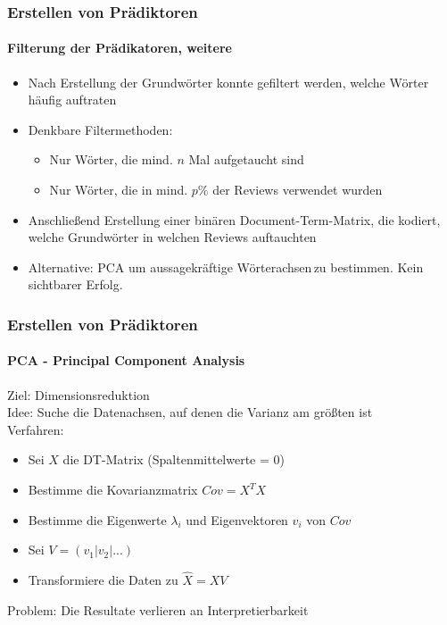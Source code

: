 \documentclass{beamer}
\begin{document}
\begin{frame}
\frametitle{Erstellen von Prädiktoren}
\framesubtitle{Filterung der Prädikatoren, weitere}
\begin{itemize}\itemsep12pt
\item Nach Erstellung der Grundwörter konnte gefiltert werden, welche Wörter häufig auftraten
\item Denkbare Filtermethoden:
\begin{itemize}
\item Nur Wörter, die mind. $n$ Mal aufgetaucht sind 
\item Nur Wörter, die in mind. $p\%$ der Reviews verwendet wurden
\end{itemize} 
\item Anschließend Erstellung einer binären Document-Term-Matrix, die kodiert, welche Grundwörter in welchen Reviews auftauchten
\item Alternative: PCA um aussagekräftige \glqq Wörterachsen\grqq \,zu bestimmen. Kein sichtbarer Erfolg.
\end{itemize}
\end{frame}

\begin{frame}
 \frametitle{Erstellen von Prädiktoren}
 \framesubtitle{PCA - Principal Component Analysis}
 Ziel: Dimensionsreduktion \\
 \vspace{12pt}
 Idee: Suche die Datenachsen, auf denen die Varianz am größten ist \\
 \vspace{12pt}
 Verfahren:\\
 
 \begin{itemize}
  \item Sei $X$ die DT-Matrix (Spaltenmittelwerte = 0)
  \item Bestimme die Kovarianzmatrix $Cov = X^TX$
  \item Bestimme die Eigenwerte $\lambda_i$ und Eigenvektoren $v_i$ von $Cov$
  \item Sei $V = (v_1| v_2| ...)$
  \item Transformiere die Daten zu $\hat{X} = X V$
 \end{itemize}

 \vspace{12pt}
 Problem: Die Resultate verlieren an Interpretierbarkeit
 
\end{frame}
\end{document}
